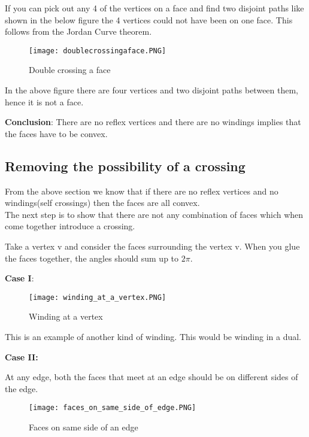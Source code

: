 \documentclass{article}
\begin{document}
    \begin{remark}
    If you can pick out any 4 of the vertices on a face and find two disjoint paths like shown in the below figure the 4 vertices could not have been on one face. This follows from the Jordan Curve theorem.
    \end{remark}

    \begin{figure}[H]
            \centering
            \texttt{[image: doublecrossingaface.PNG]}
            \caption{Double crossing a face}
    \end{figure}

    In the above figure there are four vertices and two disjoint paths between them, hence it is not a face.
    
    
    \textbf{Conclusion}:
     There are no reflex vertices and there are no windings implies that the faces have to be convex.
    
    \subsection{Removing the possibility of a crossing}
    
    From the above section we know that if there are no reflex vertices and no windings(self crossings) then the faces are all convex.\\
    The next step is to show that there are not any combination of faces which when come together introduce a crossing.
    
    \begin{remark}
    Take a vertex v and consider the faces surrounding the vertex v. When you glue the faces together, the angles should sum up to ${2\pi}$.
    \end{remark}
    
    \textbf{Case I}:

    \begin{figure}[H]
            \centering
            \texttt{[image: winding\_at\_a\_vertex.PNG]}
            \caption{Winding at a vertex}
    \end{figure}

    This is an example of another kind of winding. This would be winding in a dual.
    
    
    \textbf{Case II:}
    
    
    At any edge, both the faces that meet at an edge should be on different sides of the edge.
    
    \begin{figure}[H]
            \centering
            \texttt{[image: faces\_on\_same\_side\_of\_edge.PNG]}
            \caption{Faces on same side of an edge}
    \end{figure}
    
\end{document}
